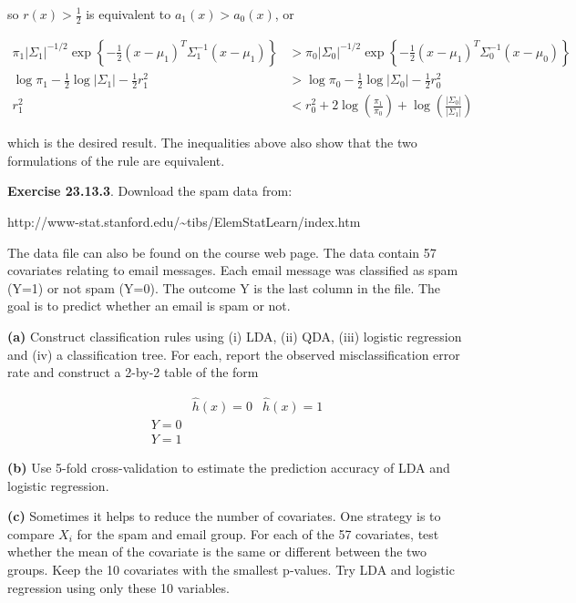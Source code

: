 so \(r(x) > \frac{1}{2}\) is equivalent to \(a_1(x) > a_0(x)\), or

\[
\begin{align}
\pi_1 |\Sigma_1|^{-1/2} \exp \left\{ -\frac{1}{2} (x - \mu_1)^T \Sigma_1^{-1} (x - \mu_1) \right\}
&>
\pi_0 |\Sigma_0|^{-1/2} \exp \left\{ -\frac{1}{2} (x - \mu_1)^T \Sigma_0^{-1} (x - \mu_0) \right\} \\
\log \pi_1 - \frac{1}{2} \log |\Sigma_1| - \frac{1}{2} r_1^2
&>
\log \pi_0 - \frac{1}{2} \log |\Sigma_0| -\frac{1}{2} r_0^2 \\
r_1^2 &< r_0^2 + 2 \log \left( \frac{\pi_1}{\pi_0} \right) + \log \left( \frac{| \Sigma_0 | }{ | \Sigma_1| }
\right)
\end{align}
\]

which is the desired result. The inequalities above also show that the
two formulations of the rule are equivalent.

\textbf{Exercise 23.13.3}. Download the spam data from:

http://www-stat.stanford.edu/\textasciitilde tibs/ElemStatLearn/index.htm

The data file can also be found on the course web page. The data contain
57 covariates relating to email messages. Each email message was
classified as spam (Y=1) or not spam (Y=0). The outcome Y is the last
column in the file. The goal is to predict whether an email is spam or
not.

\textbf{(a)} Construct classification rules using (i) LDA, (ii) QDA,
(iii) logistic regression and (iv) a classification tree. For each,
report the observed misclassification error rate and construct a 2-by-2
table of the form

\[
\begin{array}{c|cc}
 & \hat{h}(x) = 0 & \hat{h}(x) = 1 \\
\hline
Y = 0 \\
Y = 1
\end{array}
\]

\textbf{(b)} Use 5-fold cross-validation to estimate the prediction
accuracy of LDA and logistic regression.

\textbf{(c)} Sometimes it helps to reduce the number of covariates. One
strategy is to compare \(X_i\) for the spam and email group. For each of
the 57 covariates, test whether the mean of the covariate is the same or
different between the two groups. Keep the 10 covariates with the
smallest p-values. Try LDA and logistic regression using only these 10
variables.

